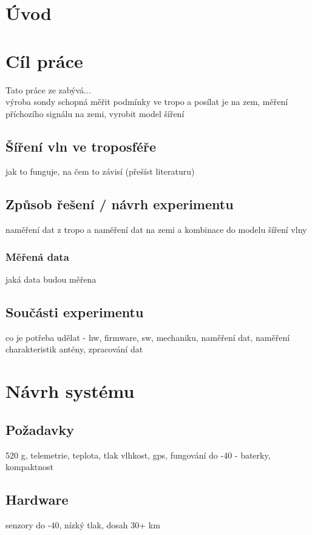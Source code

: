 \documentclass[twoside]{ctuthesis}
\theoremstyle{plain}
\theoremstyle{definition}
\theoremstyle{note}
\begin{document}
\maketitle

\chapter{Úvod}


\chapter{Cíl práce}
Tato práce ze zabývá...\\
výroba sondy schopná měřit podmínky ve tropo a posílat je na zem, měření příchozího signálu na zemi, vyrobit model šíření

	\section{Šíření vln ve troposféře}
	jak to funguje, na čem to závisí (přešíst literaturu)

	\section{Způsob řešení / návrh experimentu}
	naměření dat z tropo a naměření dat na zemi a kombinace do modelu šíření vlny
		\subsection{Měřená data}
		jaká data budou měřena 

	\section{Součásti experimentu}
	co je potřeba udělat - hw, firmware, sw, mechaniku, naměření dat, naměření charakteristik antény, zpracování dat


\chapter{Návrh systému}
	\section{Požadavky}
	520 g, telemetrie, teplota, tlak vlhkost, gps, fungování do -40 - baterky, kompaktnost

	\section{Hardware}
	senzory do -40, nízký tlak, dosah 30+ km
\end{document}
